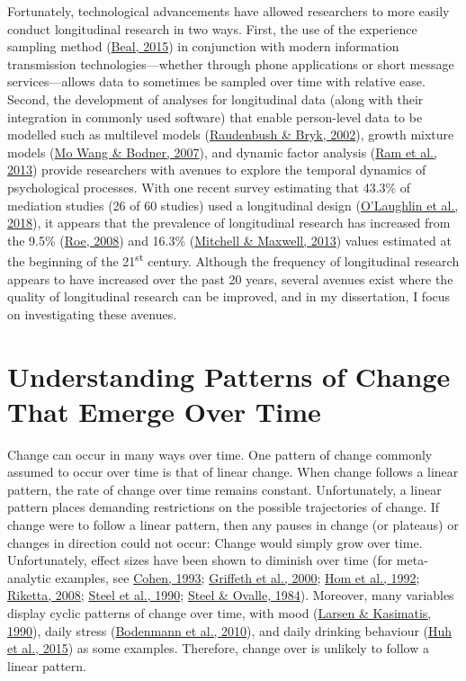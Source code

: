 \documentclass[
12pt, %
twoside,
english]{guelphthesis}
\begin{document}
Fortunately, technological advancements have allowed researchers to more easily conduct longitudinal research in two ways. First, the use of the experience sampling method (\protect\hyperlink{ref-beal2015}{Beal, 2015}) in conjunction with modern information transmission technologies---whether through phone applications or short message services---allows data to sometimes be sampled over time with relative ease. Second, the development of analyses for longitudinal data (along with their integration in commonly used software) that enable person-level data to be modelled such as multilevel models (\protect\hyperlink{ref-raudenbush2002}{Raudenbush \& Bryk, 2002}), growth mixture models (\protect\hyperlink{ref-wang2007}{Mo Wang \& Bodner, 2007}), and dynamic factor analysis (\protect\hyperlink{ref-ram2013}{Ram et al., 2013}) provide researchers with avenues to explore the temporal dynamics of psychological processes. With one recent survey estimating that 43.3\% of mediation studies (26 of 60 studies) used a longitudinal design (\protect\hyperlink{ref-olaughlin2018}{O'Laughlin et al., 2018}), it appears that the prevalence of longitudinal research has increased from the 9.5\% (\protect\hyperlink{ref-roe2008}{Roe, 2008}) and 16.3\% (\protect\hyperlink{ref-mitchell2013}{Mitchell \& Maxwell, 2013}) values estimated at the beginning of the 21\textsuperscript{st} century. Although the frequency of longitudinal research appears to have increased over the past 20 years, several avenues exist where the quality of longitudinal research can be improved, and in my dissertation, I focus on investigating these avenues.

\hypertarget{understanding-patterns-of-change-that-emerge-over-time}{%
\section{Understanding Patterns of Change That Emerge Over Time}\label{understanding-patterns-of-change-that-emerge-over-time}}

Change can occur in many ways over time. One pattern of change commonly assumed to occur over time is that of linear change. When change follows a linear pattern, the rate of change over time remains constant. Unfortunately, a linear pattern places demanding restrictions on the possible trajectories of change. If change were to follow a linear pattern, then any pauses in change (or plateaus) or changes in direction could not occur: Change would simply grow over time. Unfortunately, effect sizes have been shown to diminish over time (for meta-analytic examples, see \protect\hyperlink{ref-cohen1993}{Cohen, 1993}; \protect\hyperlink{ref-griffeth2000}{Griffeth et al., 2000}; \protect\hyperlink{ref-hom1992}{Hom et al., 1992}; \protect\hyperlink{ref-riketta2008}{Riketta, 2008}; \protect\hyperlink{ref-steel1990}{Steel et al., 1990}; \protect\hyperlink{ref-steel1984}{Steel \& Ovalle, 1984}). Moreover, many variables display cyclic patterns of change over time, with mood (\protect\hyperlink{ref-larsen1990}{Larsen \& Kasimatis, 1990}), daily stress (\protect\hyperlink{ref-bodenmann2010}{Bodenmann et al., 2010}), and daily drinking behaviour (\protect\hyperlink{ref-huh2015}{Huh et al., 2015}) as some examples. Therefore, change over is unlikely to follow a linear pattern.
\end{document}
